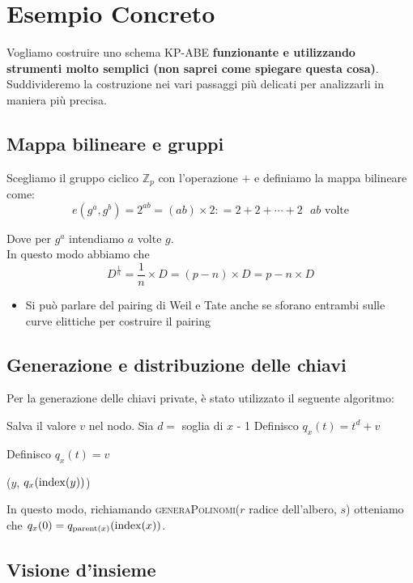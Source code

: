 \chapter{Esempio Concreto}

Vogliamo costruire uno schema KP-ABE \textbf{funzionante e utilizzando strumenti molto semplici (non saprei come spiegare questa cosa)}.\\
Suddivideremo la costruzione nei vari passaggi più delicati per analizzarli in maniera più precisa.

\section{Mappa bilineare e gruppi}

Scegliamo il gruppo ciclico $\mathbb{Z}_{p}$ con l'operazione $+$ e definiamo la mappa bilineare come:
\[ e(g^a,g^b) = 2^{ab} = (ab) \times 2 : = 2 + 2 + \cdots + 2 \text{ $ab$ volte}\]

Dove per $g^a$ intendiamo $a$ volte $g$.\\
In questo modo abbiamo che
\[ D^{\frac{1}{n}} = \frac{1}{n} \times D = (p - n) \times D = p - n \times D\]
\vspace{1cm}


\begin{itemize}
	\item Si può parlare del pairing di Weil e Tate anche se sforano entrambi sulle curve elittiche per costruire il pairing
\end{itemize}

\section{Generazione e distribuzione delle chiavi}



Per la generazione delle chiavi private, è stato utilizzato il seguente algoritmo:
\vspace{0.3cm}
\begin{algorithmic}
   		\State Salva il valore $v$ nel nodo.
   \Else
   		\State Sia $d = $ soglia di $x$ - 1
   			\State Definisco $q_x(t) = t^d + v$ 
   		
   		\Else
   			\State Definisco $q_x(t) = v$
   		
   		\EndIf

   			($y$, $q_x(\operatorname{index}(y))$) 
   		\EndFor
   \EndIf
\EndFunction
\end{algorithmic}
\vspace{0.3cm}
In questo modo, richiamando {\scshape generaPolinomi}($r$ radice dell'albero, $s$) otteniamo che $q_x(0) = q_{\operatorname{parent}(x)}(\operatorname{index}(x))$.

\section{Visione d'insieme}

